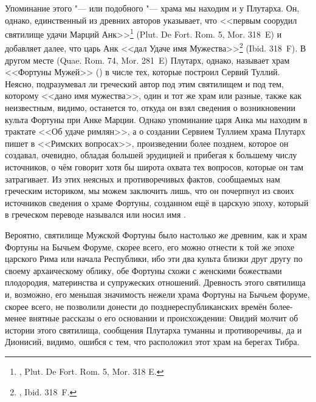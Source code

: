 Упоминание этого "--- или подобного "--- храма мы находим и у Плутарха. Он, однако, единственный из древних авторов указывает, что <<первым соорудил святилище удачи Марций Анк>>\footnote{, Plut. De Fort. Rom. 5, Mor. 318 E.} (Plut. De Fort. Rom. 5, Mor. 318~E) и добавляет далее, что царь Анк <<дал Удаче имя Мужества>>\footnote{, Ibid. 318~F.} (Ibid. 318~F). В другом месте (Quae. Rom. 74, Mor. 281~E) Плутарх, однако, называет храм <<Фортуны Мужей>> () в числе тех, которые построил Сервий Туллий. Неясно, подразумевал ли греческий автор под этим святилищем и под тем, которому <<дано имя мужества>>, один и тот же храм или разные, также как неизвестным, видимо, останется то, откуда он взял сведения о возникновении культа Фортуны при Анке Марции. Однако упоминание царя Анка мы находим в трактате <<Об удаче римлян>>, а о создании Сервием Туллием храма  Плутарх пишет в <<Римских вопросах>>, произведении более позднем, которое он создавал, очевидно, обладая большей эрудицией и прибегая к большему числу источников, о чём говорит хотя бы широта охвата тех вопросов, которые он там затрагивает. Из этих неясных и противоречивых фактов, сообщаемых нам греческим историком, мы можем заключить лишь, что он почерпнул из своих источников сведения о храме Фортуны, созданном ещё в царскую эпоху, который в греческом переводе назывался  или носил имя .



Вероятно, святилище Мужской Фортуны было настолько же древним, как и храм Фортуны на Бычьем Форуме, скорее всего, его можно отнести к той же эпохе царского Рима или начала Республики, ибо эти два культа близки друг другу по своему архаическому облику, обе Фортуны схожи с женскими божествами плодородия, материнства и супружеских отношений. Древность этого святилища и, возможно, его меньшая значимость нежели храма Фортуны на Бычьем форуме, скорее всего, не позволили донести до позднереспубликанских времён более-менее внятные рассказы о его основании и происхождении: Овидий молчит об истории этого святилища, сообщения Плутарха туманны и противоречивы, да и Дионисий, видимо, ошибся с тем, что расположил этот храм на берегах Тибра.

